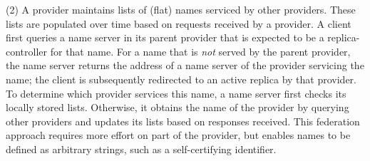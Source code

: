 (2) A provider maintains lists of (flat) names serviced by other providers. These lists are populated over time based on requests received by a provider.  A client first queries a name server in its parent provider that is expected to be a replica-controller for that name. For a name that is \emph{not} served by the parent provider, the name server returns the address of a name server of the provider servicing the name; the client is subsequently redirected to an active replica by that provider. To determine which provider services this name, a name server first checks its locally stored lists. Otherwise, it obtains the name of the provider by querying other providers and updates its lists based on responses received. 
This federation approach requires more effort on part of the provider, but enables names to be defined as arbitrary strings, such as a self-certifying identifier.








